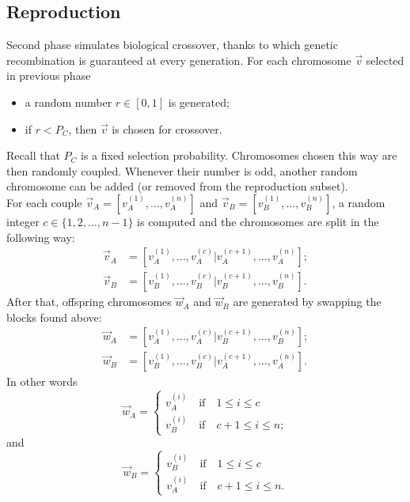 \documentclass[%
    corpo=11pt,
    twoside,
    stile=classica,
    oldstyle,
    autoretitolo,
    tipotesi=magistrale,
    greek,
    evenboxes,
    english
]{toptesi}
\begin{document}
\subsection{Reproduction}
Second phase simulates biological crossover, thanks to which genetic recombination is guaranteed at every generation. For each chromosome $\vec{v}$ selected in previous phase
\begin{itemize}
\item a random number  $r\in \left[0,1\right]$ is generated;
\item if $r < P_C$, then $\vec{v}$ is chosen for crossover.
\end{itemize}
Recall that $P_C$ is a fixed selection probability. Chromosomes chosen this way are then randomly coupled. Whenever their number is odd, another random chromosome can be added (or removed from the reproduction subset).\\
For each couple $\vec{v}_A = \left[v_A^{(1)}, \dots, v_A^{(n)} \right] $ and $\vec{v}_B = \left[v_B^{(1)}, \dots, v_B^{(n)} \right] $, a random integer 
$c \in \{1, 2, \dots, n - 1 \}$ is computed and the chromosomes are split in the following way:
\begin{align}
\vec{v}_A &= \left[v_A^{(1)}, \dots, v_A^{(c)} | v_A^{(c+1)}, \dots,  v_A^{(n)} \right]; \nonumber \\
\vec{v}_B &= \left[v_B^{(1)}, \dots, v_B^{(c)} | v_B^{(c+1)}, \dots,  v_B^{(n)} \right].
\end{align}
After that, offspring chromosomes $\vec{w}_A$ and $\vec{w}_B$ are generated by swapping the blocks found above:
\begin{align}
\vec{w}_A &= \left[v_A^{(1)}, \dots, v_A^{(c)} | v_B^{(c+1)}, \dots,  v_B^{(n)} \right]; \nonumber \\
\vec{w}_B &= \left[v_B^{(1)}, \dots, v_B^{(c)} | v_A^{(c+1)}, \dots,  v_A^{(n)} \right].
\end{align}
In other words
\begin{equation}
\vec{w}_A = \begin{cases}
v_A^{(i)} \quad \text{if} \quad 1 \leq i \leq c \\
v_B^{(i)} \quad \text{if} \quad c + 1 \leq i \leq n;
\end{cases} 
\end{equation}
and
\begin{equation}
\vec{w}_B = \begin{cases}
v_B^{(i)} \quad \text{if} \quad 1 \leq i \leq c \\
v_A^{(i)} \quad \text{if} \quad c + 1 \leq i \leq n.
\end{cases}
\end{equation}
\end{document}
